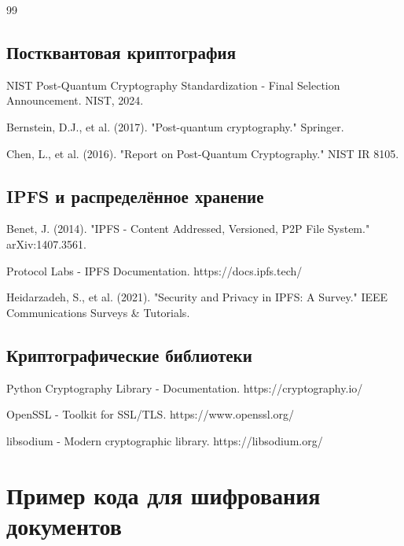 \documentclass[a4paper,14pt]{extreport}
\begin{document}
\begin{thebibliography}{99}
\section*{Постквантовая криптография}

 NIST Post-Quantum Cryptography Standardization - Final Selection Announcement. NIST, 2024.

 Bernstein, D.J., et al. (2017). "Post-quantum cryptography." Springer.

 Chen, L., et al. (2016). "Report on Post-Quantum Cryptography." NIST IR 8105.

\section*{IPFS и распределённое хранение}

 Benet, J. (2014). "IPFS - Content Addressed, Versioned, P2P File System." arXiv:1407.3561.

 Protocol Labs - IPFS Documentation. https://docs.ipfs.tech/

 Heidarzadeh, S., et al. (2021). "Security and Privacy in IPFS: A Survey." IEEE Communications Surveys \& Tutorials.

\section*{Криптографические библиотеки}

 Python Cryptography Library - Documentation. https://cryptography.io/

 OpenSSL - Toolkit for SSL/TLS. https://www.openssl.org/

 libsodium - Modern cryptographic library. https://libsodium.org/

\end{thebibliography}

\newpage

\appendix

\chapter{Пример кода для шифрования документов}
\end{document}
